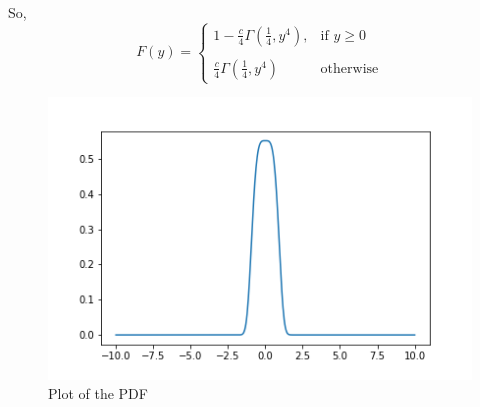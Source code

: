 \documentclass{article}
\theoremstyle{remark}
\begin{document}
So,
\[
    F(y)= 
\begin{cases}
    1 - \frac{c}{4} \Gamma(\frac{1}{4},y^4),& \text{if } y\geq 0\\ \\
    \frac{c}{4} \Gamma(\frac{1}{4},y^4)              & \text{otherwise}
\end{cases}
\]
\begin{figure}
    \centering
    \includegraphics[scale=0.75]{PDF.png}
    \caption{Plot of the PDF}
    \label{fig:my_label}
\end{figure}
\end{document}
